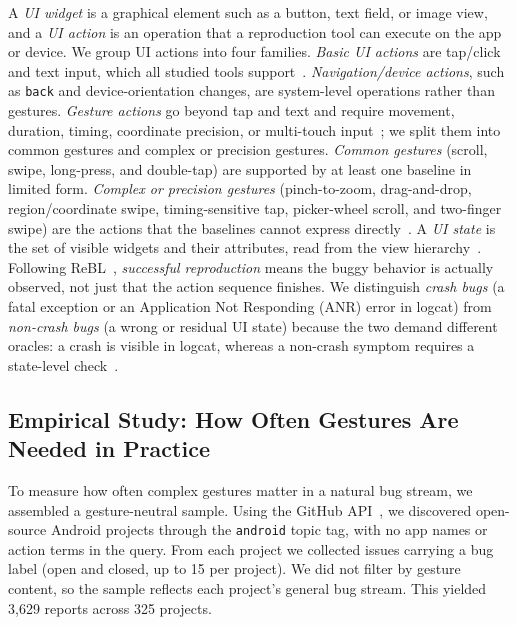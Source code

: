 \documentclass[10pt,conference,a4paper]{IEEEtran}
\begin{document}
  A \emph{UI widget} is a graphical element such as a button, text field, or image view, and a \emph{UI action} is an operation that a reproduction tool can execute on the app or device. We group UI actions into four families. \emph{Basic UI actions} are tap/click and text input, which all studied tools support~\cite{rebl,adbgpt,reactdroid}. \emph{Navigation/device actions}, such as \texttt{back} and device-orientation changes, are system-level operations rather than gestures. \emph{Gesture actions} go beyond tap and text and require movement, duration, timing, coordinate precision, or multi-touch input~\cite{androidmotion}; we split them into common gestures and complex or precision gestures. \emph{Common gestures} (scroll, swipe, long-press, and double-tap) are supported by at least one baseline in limited form. \emph{Complex or precision gestures} (pinch-to-zoom, drag-and-drop, region/coordinate swipe, timing-sensitive tap, picker-wheel scroll, and two-finger swipe) are the actions that the baselines cannot express directly~\cite{rebl,adbgpt,reactdroid}.
  A \emph{UI state} is the
  set of visible widgets and their attributes, read from the view
  hierarchy~\cite{androidmanual,uiautomator2}. Following ReBL~\cite{rebl},
  \emph{successful reproduction} means the buggy behavior is actually
  observed, not just that the action sequence finishes. We distinguish
  \emph{crash bugs} (a fatal exception or an Application Not Responding
  (ANR) error in logcat) from \emph{non-crash bugs} (a wrong or residual
  UI state) because the two demand different oracles: a crash is visible
  in logcat, whereas a non-crash symptom requires a state-level
  check~\cite{deepstate}. %

  \subsection{Empirical Study: How Often Gestures Are Needed in Practice}
  \label{sec:prevalence}

  To measure how often complex gestures matter in a natural bug stream, we
  assembled a gesture-neutral sample. Using the GitHub
  API~\cite{githubapi}, we discovered open-source Android projects through
  the \texttt{android} topic tag, with no app names or action terms in
  the query. From each project we collected issues carrying a bug label
  (open and closed, up to 15 per project). We did not filter by gesture
  content, so the sample reflects each project's general bug stream. This
  yielded 3{,}629 reports across 325 projects.
\end{document}
